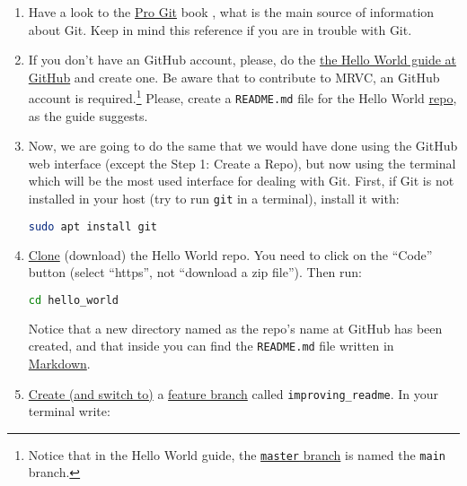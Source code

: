 \begin{enumerate}
  
\item Have a look to the \href{https://git-scm.com/book/en/v2}{Pro Git} 
  book \cite{Git-book}, what is the main source of information about
  Git. Keep in mind this reference if you are in trouble with Git.

\item If you don't have an GitHub account, please, do the
  \href{https://guides.github.com/activities/hello-world/}{the Hello
    World guide at GitHub} and create one. Be aware that to contribute
    to MRVC, an GitHub account is required.\footnote{Notice that
    in the Hello World guide,
    the \href{https://git-scm.com/book/en/v2/Git-Branching-Branches-in-a-Nutshell}{\texttt{master}
    branch} is named the \texttt{main} branch.} Please, create
    a \texttt{README.md} file for the Hello
    World \href{https://en.wikipedia.org/wiki/Software_repository}{repo},
    as the guide suggests.

\item Now, we are going to do the same that we would have done using
  the GitHub web interface (except the Step 1: Create a Repo), but now
  using the terminal which will be the most used interface for dealing
  with Git. First, if Git is not installed in your host (try to run
  \texttt{git} in a terminal), install it with:

  \begin{lstlisting}[language=bash]
    sudo apt install git
  \end{lstlisting}

\item
  \href{https://docs.github.com/en/github/getting-started-with-github/github-glossary#clone}{Clone}
  (download) the Hello World repo. You need to click on the ``Code''
  button (select ``https'', not ``download a
  zip file''). Then run:

  \begin{lstlisting}[language=bash]
    cd hello_world
  \end{lstlisting}

  Notice that a new directory named as the repo's name at GitHub has
  been created, and that inside you can find the \texttt{README.md}
  file written in
  \href{https://daringfireball.net/projects/markdown/}{Markdown}.

\item \href{https://docs.github.com/en/github/getting-started-with-github/github-glossary#checkout}{Create (and switch to)} a
  \href{https://docs.github.com/en/github/getting-started-with-github/github-glossary#feature-branch}{feature
    branch} called \texttt{improving\_readme}. In your terminal write:
  

\end{enumerate}
